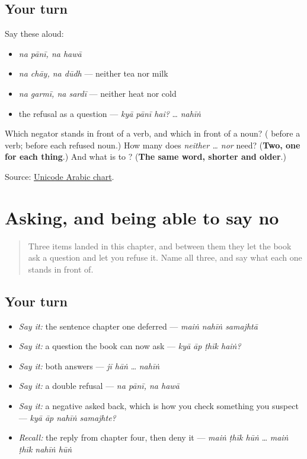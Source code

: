 \subsection*{Your turn}
Say these aloud:

\begin{itemize}
\raggedright
  \item \emph{na pānī, na hawā}
  \item \emph{na chāy, na dūdh} — neither tea nor milk
  \item \emph{na garmī, na sardī} — neither heat nor cold
  \item the refusal as a question — \emph{kyā pānī hai?} … \emph{nahīṅ}
\end{itemize}

\begin{tcolorbox}[breakable,colback=teal!4,colframe=teal!35!black,title={Before you move on}]
Which negator stands in front of a verb, and which in front of a noun? (\textbf{} before a verb; \textbf{} before each refused noun.) How many \textbf{} does \emph{neither … nor} need? (\textbf{Two, one for each thing}.) And what is \textbf{} to \textbf{}? (\textbf{The same word, shorter and older}.)

Source: \href{https://www.unicode.org/charts/PDF/U0600.pdf}{Unicode Arabic chart}.
\end{tcolorbox}
\section[\texorpdfstring{\ur{نہیں} · \ur{کیا} · \ur{نہ} (nahīṅ · kyā · na)}{نہیں · کیا · نہ (nahīṅ · kyā · na)}]{Asking, and being able to say no}

\label{lesson:UR-R19-three-refusals}



\begin{quote}
Three items landed in this chapter, and between them they let the book ask a question and let you refuse it. Name all three, and say what each one stands in front of.
\end{quote}

\subsection*{Your turn}
\begin{itemize}
\raggedright
  \item \emph{Say it:} the sentence chapter one deferred — \emph{maiṅ nahīṅ samajhtā}
  \item \emph{Say it:} a question the book can now ask — \emph{kyā āp ṭhīk haiṅ?}
  \item \emph{Say it:} both answers — \emph{jī hāṅ} … \emph{nahīṅ}
  \item \emph{Say it:} a double refusal — \emph{na pānī, na hawā}
  \item \emph{Say it:} a negative asked back, which is how you check something you suspect — \emph{kyā āp nahīṅ samajhte?}
  \item \emph{Recall:} the reply from chapter four, then deny it — \emph{maiṅ ṭhīk hūṅ} … \emph{maiṅ ṭhīk nahīṅ hūṅ}
\end{itemize}


